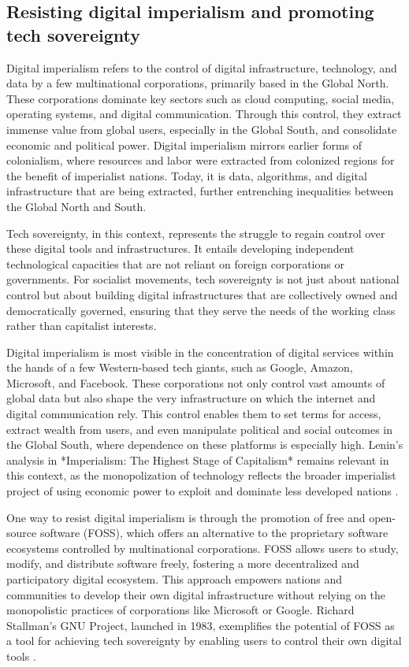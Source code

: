 \begin{refsection}
\subsection{Resisting digital imperialism and promoting tech sovereignty}

Digital imperialism refers to the control of digital infrastructure, technology, and data by a few multinational corporations, primarily based in the Global North. These corporations dominate key sectors such as cloud computing, social media, operating systems, and digital communication. Through this control, they extract immense value from global users, especially in the Global South, and consolidate economic and political power. Digital imperialism mirrors earlier forms of colonialism, where resources and labor were extracted from colonized regions for the benefit of imperialist nations. Today, it is data, algorithms, and digital infrastructure that are being extracted, further entrenching inequalities between the Global North and South.

Tech sovereignty, in this context, represents the struggle to regain control over these digital tools and infrastructures. It entails developing independent technological capacities that are not reliant on foreign corporations or governments. For socialist movements, tech sovereignty is not just about national control but about building digital infrastructures that are collectively owned and democratically governed, ensuring that they serve the needs of the working class rather than capitalist interests.

Digital imperialism is most visible in the concentration of digital services within the hands of a few Western-based tech giants, such as Google, Amazon, Microsoft, and Facebook. These corporations not only control vast amounts of global data but also shape the very infrastructure on which the internet and digital communication rely. This control enables them to set terms for access, extract wealth from users, and even manipulate political and social outcomes in the Global South, where dependence on these platforms is especially high. Lenin’s analysis in *Imperialism: The Highest Stage of Capitalism* remains relevant in this context, as the monopolization of technology reflects the broader imperialist project of using economic power to exploit and dominate less developed nations \cite[pp.~91-98]{lenin_imperialism}.

One way to resist digital imperialism is through the promotion of free and open-source software (FOSS), which offers an alternative to the proprietary software ecosystems controlled by multinational corporations. FOSS allows users to study, modify, and distribute software freely, fostering a more decentralized and participatory digital ecosystem. This approach empowers nations and communities to develop their own digital infrastructure without relying on the monopolistic practices of corporations like Microsoft or Google. Richard Stallman’s GNU Project, launched in 1983, exemplifies the potential of FOSS as a tool for achieving tech sovereignty by enabling users to control their own digital tools \cite[pp.~45-53]{stallman_free_software}.


\end{refsection}
